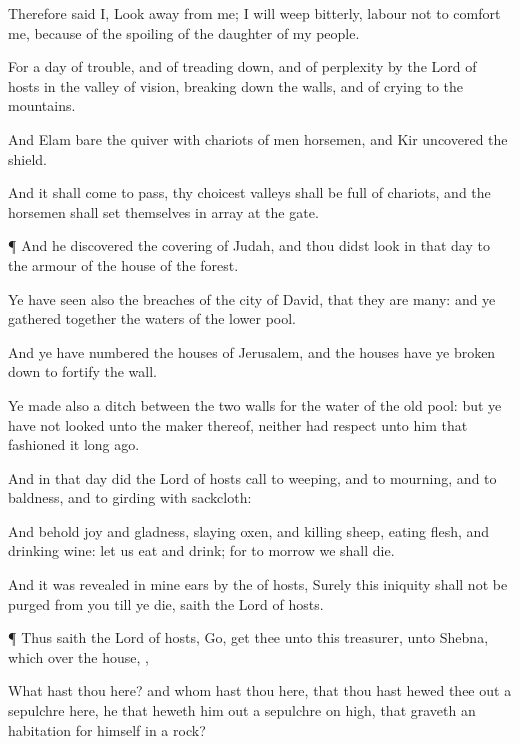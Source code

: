 {Therefore
said I, Look
away from me; I will
weep
bitterly,
labour not to
comfort me, because of the
spoiling of the
daughter of my
people.

For
{} a
day of
trouble, and of treading
down, and of
perplexity by the
Lord
{} of
hosts in the
valley of
vision,
breaking down the
walls, and of
crying to the
mountains.

And
Elam
bare the
quiver with
chariots of
men
{}
horsemen, and
Kir
uncovered the
shield.

And it shall come to pass,
{} thy
choicest
valleys shall be
full of
chariots, and the
horsemen shall
set themselves in
array at the
gate.


\par }{\PP {}¶ And he
discovered the
covering of
Judah, and thou didst
look in that
day to the
armour of the
house of the
forest.

Ye have
seen also the
breaches of the
city of
David, that they are
many: and ye gathered
together the
waters of the
lower
pool.

And ye have
numbered the
houses of
Jerusalem, and the
houses have ye broken
down to
fortify the
wall.

Ye
made also a
ditch between the two
walls for the
water of the
old
pool: but ye have not
looked unto the
maker thereof, neither had
respect unto him that
fashioned it long
ago.

And in that
day did the
Lord
{} of
hosts
call to
weeping, and to
mourning, and to
baldness, and to
girding with
sackcloth:

And behold
joy and
gladness,
slaying
oxen, and
killing
sheep,
eating
flesh, and
drinking
wine: let us
eat and
drink; for to
morrow we shall
die.

And it was
revealed in mine
ears by the
{} of
hosts, Surely this
iniquity shall not be
purged from you till ye
die,
saith the
Lord
{} of
hosts.


\par }{\PP {}¶ Thus
saith the
Lord
{} of
hosts,
Go,
get thee unto this
treasurer,
{} unto
Shebna, which
{} over the
house,
{},

What hast thou here? and whom hast thou here, that thou hast hewed thee
out a
sepulchre
here,
{} he that heweth him
out a
sepulchre on
high,
{} that
graveth an
habitation for himself in a
rock?

}
